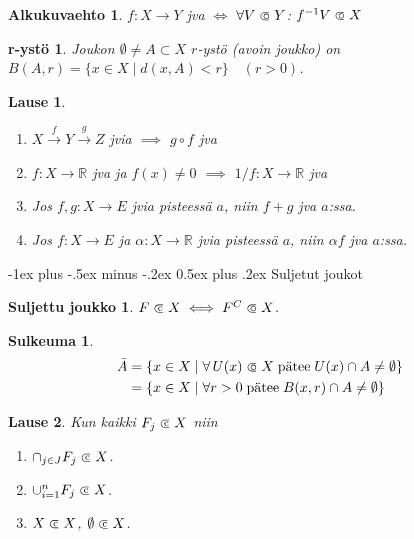 \documentclass[landscape,a4paper,10pt]{article}
\makeatletter
\renewcommand{\section}{\@startsection{section}{1}{0mm}%
                                {-1ex plus -.5ex minus -.2ex}%
                                {0.5ex plus .2ex}%
                                {\color{red}\normalfont\large\bfseries}}
\newcommand\opn{\mathrel{\ooalign{$\subset$\cr
  \hidewidth\hbox{$\circ\mkern.5mu$}\cr}}}
\newcommand\cls{\mathrel{\ooalign{$\subset$\cr
\hidewidth\raise.225ex\hbox{$\text{{\scriptsize c}}\mkern2mu$}\cr}}}
\theoremstyle{customtheoremstyle}
\newtheorem*{theorem}{Lause}
\makeatother
\begin{document}
\begin{multicols*}{3}
\newtheorem*{alkukuvaehto}{Alkukuvaehto}
\begin{alkukuvaehto}
  $f: X \rightarrow Y$ jva $\iff$ $\forall V \opn Y$: $f^{-1} V \opn X$
\end{alkukuvaehto}

\newtheorem*{rystö}{r-ystö}
\begin{rystö}
  Joukon $\emptyset \neq A \subset X$ $r$-ystö (avoin joukko) on
  $B(A,r) = \{x \in X \; | \; d(x,A) < r\} \quad (r>0)$.
\end{rystö}

\begin{theorem}
  \begin{enumerate}
    \item[(1)]{$X \stackrel{f}{\rightarrow} Y \stackrel{g}{\rightarrow} Z$ jvia
      $\implies$ $g \circ f$ jva}
    \item[(2)]{$f : X \rightarrow \mathbb{R}$ jva ja $f(x) \neq 0$ $\implies$
      $1/f : X \rightarrow \mathbb{R}$ jva}
    \item[(3)]{Jos $f,g: X \rightarrow E$ jvia pisteessä $a$, niin $f+g$ jva
      $a$:ssa.}
    \item[(4)]{Jos $f: X \rightarrow E$ ja $\alpha: X \rightarrow \mathbb{R}$
      jvia pisteessä $a$, niin $\alpha f$ jva $a$:ssa.}
  \end{enumerate}
\end{theorem}

\section{Suljetut joukot}
\newtheorem*{defn:closedSet}{Suljettu joukko}
\begin{defn:closedSet}
  $F \cls X \iff F^C \opn X$.
\end{defn:closedSet}

\newtheorem*{defn:closure}{Sulkeuma}
\begin{defn:closure}
  \begin{align*}
    \bar{A} &=
    \{ x \in X \; | \; \forall \, U(x) \opn X \; \text{pätee} \; U(x) \cap A \neq \emptyset \}
    \\
    &= \{ x \in X \; | \; \forall r > 0 \; \text{pätee} \; B(x,r) \cap A \neq
    \emptyset \}
  \end{align*}
\end{defn:closure}

\begin{theorem}
  Kun kaikki $F_j \cls X$ niin
  \begin{enumerate}
    \item{$\cap_{j \in J} F_j \cls X$.}
    \item{$\cup_{i=1}^{n} F_j \cls X$.}
    \item{$X \cls X$, $\emptyset \cls X$.}
  \end{enumerate}
\end{theorem}


\end{multicols*}
\end{document}
